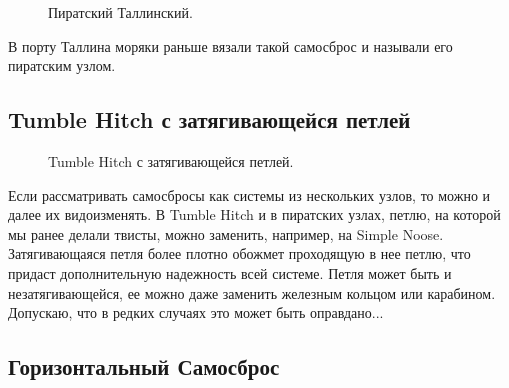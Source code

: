 \begin{figure}[H]\centering
	\subfloat[Завязывание]{\label{ris:Tallinsky_1}
	\tcbox[enhanced jigsaw,colframe=black,opacityframe=0.5,opacityback=0.5,height=4cm]
		{\centering
			}
		}
\hfil
	\subfloat[Результат]{\label{ris:Tallinsky_2}
	\tcbox[enhanced jigsaw,colframe=black,opacityframe=0.5,opacityback=0.5,height=4cm]
		{\centering
			}
		}
	\caption{Пиратский Таллинский.}\label{ris:Tallinsky}
\end{figure}

В порту Таллина моряки раньше вязали такой самосброс и называли его пиратским узлом.


\subsection{Tumble Hitch с затягивающейся петлей}

\begin{figure}[H]\centering
	\subfloat[Завязывание]{\label{ris:Samosbros_Simple_Noose_1}
	\tcbox[enhanced jigsaw,colframe=black,opacityframe=0.5,opacityback=0.5,height=6cm]
		{\centering
			}
		}
\hfil
	\subfloat[Завязывание]{\label{ris:Samosbros_Simple_Noose_2}
	\tcbox[enhanced jigsaw,colframe=black,opacityframe=0.5,opacityback=0.5,height=6cm]
		{\centering
			}
		}
\hfil
	\subfloat[Результат]{\label{ris:Samosbros_Simple_Noose_3}
	\tcbox[enhanced jigsaw,colframe=black,opacityframe=0.5,opacityback=0.5]
		{\centering
			}
		}
	\caption{Tumble Hitch с затягивающейся петлей.}\label{ris:Samosbros_Simple_Noose}
\end{figure}

Если рассматривать самосбросы как системы из нескольких узлов, то можно и далее их видоизменять. В Tumble Hitch и в пиратских узлах, петлю, на которой мы ранее делали твисты, можно заменить, например, на Simple Noose. Затягивающаяся петля более плотно обожмет проходящую в нее петлю, что придаст дополнительную надежность всей системе. Петля может быть и незатягивающейся, ее можно даже заменить железным кольцом или карабином. Допускаю, что в редких случаях это может быть оправдано...

\subsection{Горизонтальный Самосброс}

